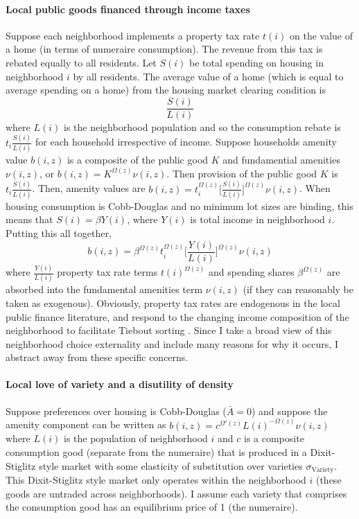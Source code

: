 \documentclass[12pt]{article}
\begin{document}
	\paragraph*{Local public goods financed through income taxes} Suppose each neighborhood implements a property tax rate $t(i)$ on the value of a home (in terms of numeraire consumption). The revenue from this tax is rebated equally to all residents. Let $S(i)$ be total spending on housing in neighborhood $i$ by all residents. The average value of a home (which is equal to average spending on a home) from the housing market clearing condition is $$\frac{S(i)}{L(i)}$$ where $L(i)$ is the neighborhood population and so the consumption rebate is $t_{i}\frac{S(i)}{L(i)}$ for each household irrespective of income. Suppose households amenity value $b(i, z)$ is a composite of the public good $K$ and fundamential amenities $\nu(i, z)$, or $b(i, z) = K^{\Omega(z)}\nu(i, z)$. Then provision of the public good $K$ is $t_{i}\frac{S(i)}{L(i)}$. Then, amenity values are $b(i, z) = t_{i}^{\Omega(z)}\bigg[\frac{S(i)}{L(i)}\bigg]^{\Omega(z)}\nu(i, z)$. When housing consumption is Cobb-Douglas and no minimum lot sizes are binding, this means that $S(i) = \beta Y(i)$, where $Y(i)$ is total income in neighborhood $i$. Putting this all together, $$b(i, z) = \beta^{\Omega(z)}t_{i}^{\Omega(z)}\bigg[\frac{Y(i)}{L(i)}\bigg]^{\Omega(z)}\nu(i, z)$$ where $\frac{Y(i)}{L(i)}$ property tax rate terms $t(i)^{\Omega(z)}$ and spending shares $\beta^{\Omega(z)}$ are absorbed into the fundamental amenities term $\nu(i, z)$ (if they can reasonably be taken as exogenous). Obviously, property tax rates are endogenous in the local public finance literature, and respond to the changing income composition of the neighborhood to facilitate Tiebout sorting \citep{calabresetal, ineffTiebout}. Since I take a broad view of this neighborhood choice externality and include many reasons for why it occurs, I abstract away from these specific concerns. 
	
	\paragraph*{Local love of variety and a disutility of density} Suppose preferences over housing is Cobb-Douglas ($\bar{A} = 0$) and suppose the amenity component can be written as $b(i, z) = c^{\Omega'(z)}L(i)^{-\Omega(z)}\nu(i, z)$ where $L(i)$ is the population of neighborhood $i$ and $c$ is a composite consumption good (separate from the numeraire) that is produced in a Dixit-Stiglitz style market with some elasticity of substitution over varieties $\sigma_{\text{Variety}}$. This Dixit-Stiglitz style market only operates within the neighborhood $i$ (these goods are untraded across neighborhoods). I assume each variety that comprises the consumption good has an equilibrium price of 1 (the numeraire).
	
\end{document}
